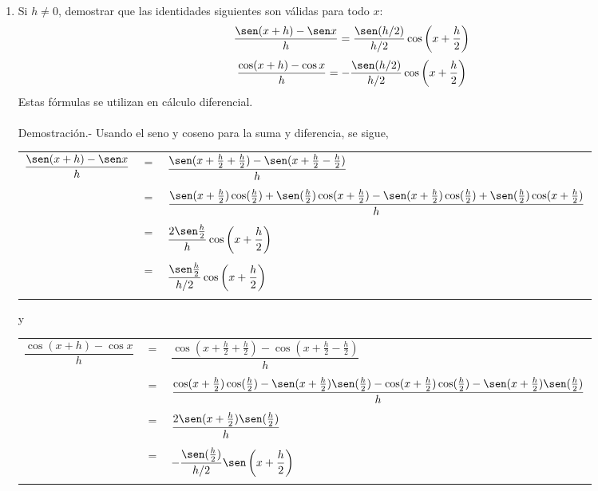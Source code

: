 \begin{enumerate}[\bfseries 1.]
\item Si $h\neq 0$, demostrar que las identidades siguientes son válidas para todo $x$:
    $$\dfrac{\sen(x+h)-\sen x}{h} = \dfrac{\sen(h/2)}{h/2}\cos\left(x+\dfrac{h}{2}\right)$$
    $$\dfrac{\cos(x+h)-\cos x}{h} = -\dfrac{\sen(h/2)}{h/2}\cos\left(x+\dfrac{h}{2}\right)$$
    Estas fórmulas se utilizan en cálculo diferencial.\\\\
    Demostración.-\; Usando el seno y coseno para la suma y diferencia, se sigue,
    \begin{center}
	\begin{tabular}{rcl}
	    $\dfrac{\sen(x+h)-\sen x}{h}$&$=$&$\dfrac{\sen(x+\frac{h}{2}+\frac{h}{2})-\sen(x+\frac{h}{2}-\frac{h}{2})}{h}$\\\\
					 &$=$&$\dfrac{\sen(x+\frac{h}{2})\cos(\frac{h}{2})+\sen(\frac{h}{2})\cos(x+\frac{h}{2})-\sen(x+\frac{h}{2})\cos (\frac{h}{2})+\sen(\frac{h}{2})\cos(x+\frac{h}{2})}{h}$\\\\
					 &$=$&$\dfrac{2\sen \frac{h}{2}}{h}\cos\left(x+\dfrac{h}{2}\right)$\\\\
					 &$=$&$\dfrac{\sen \frac{h}{2}}{h/2}\cos\left(x+\dfrac{h}{2}\right)$\\\\
	\end{tabular}
    \end{center}
    y
    \begin{center}
	\begin{tabular}{rcl}
	    $\dfrac{\cos(x+h)-\cos x}{h}$&$=$&$\dfrac{\cos(x+\frac{h}{2}+\frac{h}{2})-\cos(x+\frac{h}{2}-\frac{h}{2})}{h}$\\\\
					 &$=$&$\dfrac{\cos(x+\frac{h}{2})\cos(\frac{h}{2})-\sen(x+\frac{h}{2})\sen(\frac{h}{2})-\cos(x+\frac{h}{2})\cos(\frac{h}{2})-\sen(x+\frac{h}{2})\sen(\frac{h}{2})}{h}$\\\\
					 &$=$&$\dfrac{2\sen(x+\frac{h}{2})\sen(\frac{h}{2})}{h}$\\\\
					 &$=$&$-\dfrac{\sen(\frac{h}{2})}{h/2}\sen\left(x+\dfrac{h}{2}\right)$\\\\
	\end{tabular}
    \end{center}


\end{enumerate}
